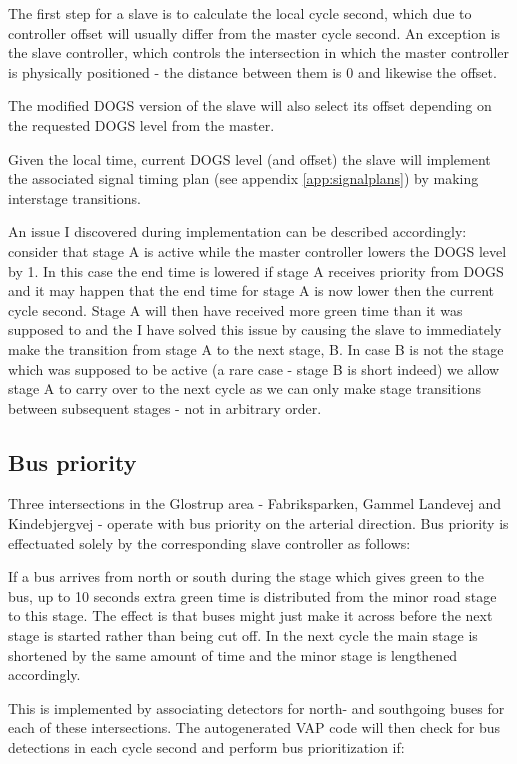 The first step for a slave is to calculate the local cycle second, which due to controller offset will usually differ from the master cycle second. An exception is the slave controller, which controls the intersection in which the master controller is physically positioned - the distance between them is 0 and likewise the offset.

The modified DOGS version of the slave will also select its offset depending on the requested DOGS level from the master.

Given the local time, current DOGS level (and offset) the slave will implement the associated signal timing plan (see appendix \ref{app:signalplans}) by making interstage transitions.

An issue I discovered during implementation can be described accordingly:
consider that stage A is active while the master controller lowers the DOGS level by 1. In this case the end time is lowered if stage A receives priority from DOGS and it may happen that the end time for stage A is now lower then the current cycle second. Stage A will then have received more green time than it was supposed to and the I have solved this issue by causing the slave to immediately make the transition from stage A to the next stage, B. In case B is not the stage which was supposed to be active (a rare case - stage B is short indeed) we allow stage A to carry over to the next cycle as we can only make stage transitions between subsequent stages - not in arbitrary order.

\subsection{Bus priority}
Three intersections in the Glostrup area - Fabriksparken, Gammel Landevej and Kindebjergvej - operate with bus priority on the arterial direction. Bus priority is effectuated solely by the corresponding slave controller as follows:

If a bus arrives from north or south during the stage which gives green to the bus, up to 10 seconds extra green time is distributed from the minor road stage to this stage. The effect is that buses might just make it across before the next stage is started rather than being cut off. In the next cycle the main stage is shortened by the same amount of time and the minor stage is lengthened accordingly.

This is implemented by associating detectors for north- and southgoing buses for each of these intersections. The autogenerated VAP code will then check for bus detections in each cycle second and perform bus prioritization if:

